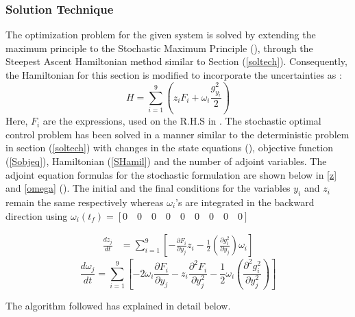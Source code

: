 \documentclass[3p,times,authoryear]{elsarticle}
\begin{document}
\subsubsection{Solution Technique}
The optimization problem for the given system is solved by extending the maximum principle to the Stochastic Maximum Principle (\cite{ramirez}), through the Steepest Ascent Hamiltonian method similar to Section (\ref{soltech}). Consequently, the Hamiltonian for this section is modified to incorporate the uncertainties as :
\begin{equation}
H = \sum_{i=1}^{9} \left( z_{i}F_{i} + \omega_{i}\frac{g_{y_{i}}^2}{2} \right) \label{SHamil}
\end{equation}
Here, $F_{i}$ are the expressions, used on the R.H.S in . The stochastic optimal control problem has been solved in a manner similar to the deterministic problem in section (\ref{soltech}) with changes in the state equations (), objective function (\ref{Sobjeq}), Hamiltonian (\ref{SHamil}) and the number of adjoint variables. The adjoint equation formulas for the stochastic formulation are shown below in \ref{z} and \ref{omega} (\cite{yenkie}). The initial and the final conditions for the variables $y_{i}$ and $z_{i}$ remain the same respectively whereas $\omega_{i}$'s are integrated in the backward direction using $\omega_{i}(t_{f}) = \left[  0 \quad 0 \quad 0 \quad 0 \quad 0 \quad 0 \quad 0 \quad 0 \quad 0 \right]$ 

\begin{align}
\frac{dz_{j}}{dt} &= \sum_{i=1}^{9} \left[ - \frac{\partial F_{i}}{\partial y_{j}} z_{i} - \frac{1}{2} \left(\frac{\partial g_{i}^{2}}{\partial y_{j}}\right)\omega_{i} \right] \label{z}
\end{align}
\begin{equation}
\frac{d \omega_{j}}{dt} = \sum_{i=1}^{9} \left[ -2 \omega_{i} \frac{\partial F_{i}}{\partial y_{j}} - z_{i} \frac{\partial^{2} F_{i}}{\partial y_{j}^{2}} - \frac{1}{2} \omega_{i} \left( \frac{\partial^{2} g_{i}^{2}}{\partial y_{j}^{2}} \right) \right] \label{omega} 
\end{equation}
%

The algorithm followed has explained in detail below. 
\end{document}
